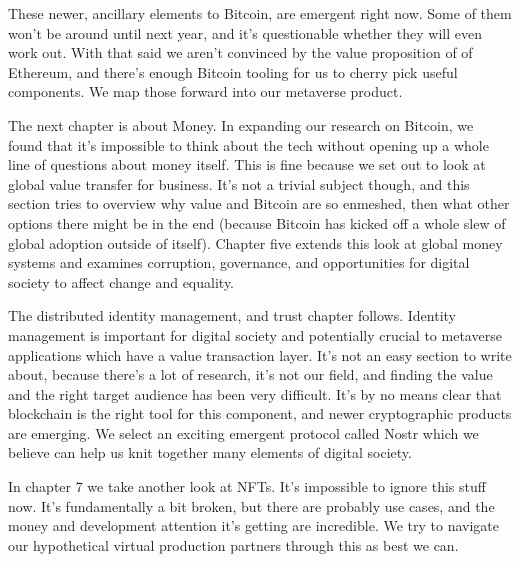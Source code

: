These newer, ancillary elements to Bitcoin, are emergent right now. Some of them won’t be around until next year, and it’s questionable whether they will even work out. With that said we aren't convinced by the value proposition of of Ethereum, and there’s enough Bitcoin tooling for us to cherry pick useful components. We map those forward into our metaverse product.\par
The next chapter is about Money. In expanding our research on Bitcoin, we found that it’s impossible to think about the tech without opening up a whole line of questions about money itself. This is fine because we set out to look at global value transfer for business. It’s not a trivial subject though, and this section tries to overview why value and Bitcoin are so enmeshed, then what other options there might be in the end (because Bitcoin has kicked off a whole slew of global adoption outside of itself). Chapter five extends this look at global money systems and examines corruption, governance, and opportunities for digital society to affect change and equality.\par
The distributed identity management, and trust chapter follows. Identity management is important for digital society and potentially crucial to metaverse applications which have a value transaction layer. It’s not an easy section to write about, because there’s a lot of research, it’s not our field, and finding the value and the right target audience has been very difficult. It's by no means clear that blockchain is the right tool for this component, and newer cryptographic products are emerging. We select an exciting emergent protocol called Nostr which we believe can help us knit together many elements of digital society.\par %
In chapter 7 we take another look at NFTs. It’s impossible to ignore this stuff now. It’s fundamentally a bit broken, but there are probably use cases, and the money and development attention it’s getting are incredible. We try to navigate our hypothetical virtual production partners through this as best we can. \par %
